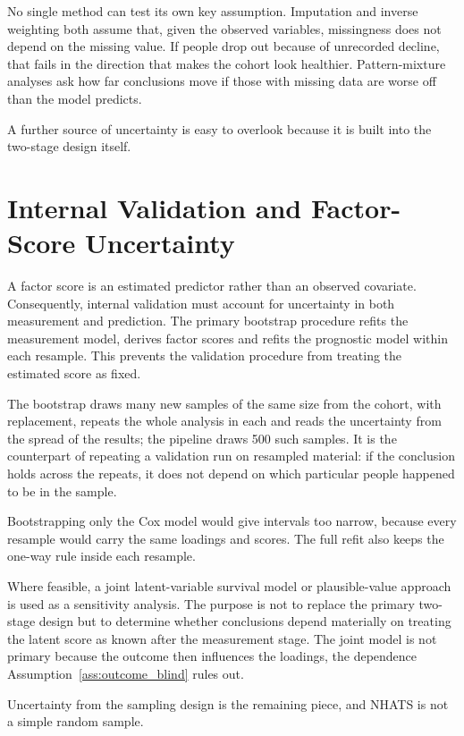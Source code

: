 No single method can test its own key assumption. Imputation and inverse weighting both assume that, given the observed variables, missingness does not depend on the missing value. If people drop out because of unrecorded decline, that fails in the direction that makes the cohort look healthier. Pattern-mixture analyses ask how far conclusions move if those with missing data are worse off than the model predicts.

A further source of uncertainty is easy to overlook because it is built into the two-stage design itself.

\section{Internal Validation and Factor-Score Uncertainty}
\label{sec:intval}

A factor score is an estimated predictor rather than an observed covariate. Consequently, internal validation must account for uncertainty in both measurement and prediction. The primary bootstrap \citep{efron_tibshirani_1993,steyerberg_2019} procedure refits the measurement model, derives factor scores and refits the prognostic model within each resample. This prevents the validation procedure from treating the estimated score as fixed.

The bootstrap draws many new samples of the same size from the cohort, with replacement, repeats the whole analysis in each and reads the uncertainty from the spread of the results; the pipeline draws 500 such samples. It is the counterpart of repeating a validation run on resampled material: if the conclusion holds across the repeats, it does not depend on which particular people happened to be in the sample.

Bootstrapping only the Cox model would give intervals too narrow, because every resample would carry the same loadings and scores. The full refit also keeps the one-way rule inside each resample.

Where feasible, a joint latent-variable survival model or plausible-value approach is used as a sensitivity analysis. The purpose is not to replace the primary two-stage design but to determine whether conclusions depend materially on treating the latent score as known after the measurement stage. The joint model is not primary because the outcome then influences the loadings, the dependence Assumption~\ref{ass:outcome_blind} rules out.

Uncertainty from the sampling design is the remaining piece, and NHATS is not a simple random sample.

